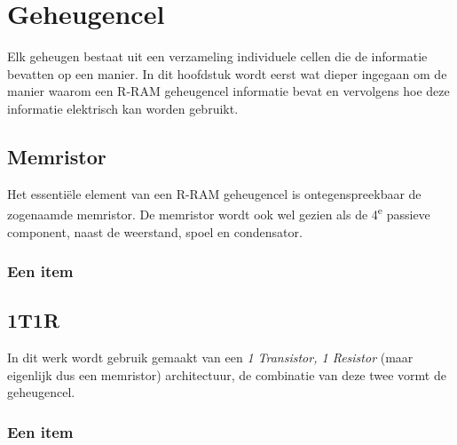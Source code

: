 \chapter{Geheugencel}
\label{cel}
Elk geheugen bestaat uit een verzameling individuele cellen die de informatie bevatten op een manier.
In dit hoofdstuk wordt eerst wat dieper ingegaan om de manier waarom een R-RAM geheugencel informatie bevat en vervolgens hoe deze informatie elektrisch kan worden gebruikt.

\section{Memristor}
Het essentiële element van een R-RAM geheugencel is ontegenspreekbaar de zogenaamde memristor.
De memristor wordt ook wel gezien als de 4\textsuperscript{e} passieve component, naast de weerstand, spoel en condensator.

\subsection{Een item}
%


\section{1T1R}
In dit werk wordt gebruik gemaakt van een \emph{1 Transistor, 1 Resistor} (maar eigenlijk dus een memristor) architectuur, de combinatie van deze twee vormt de geheugencel.

\subsection{Een item}


